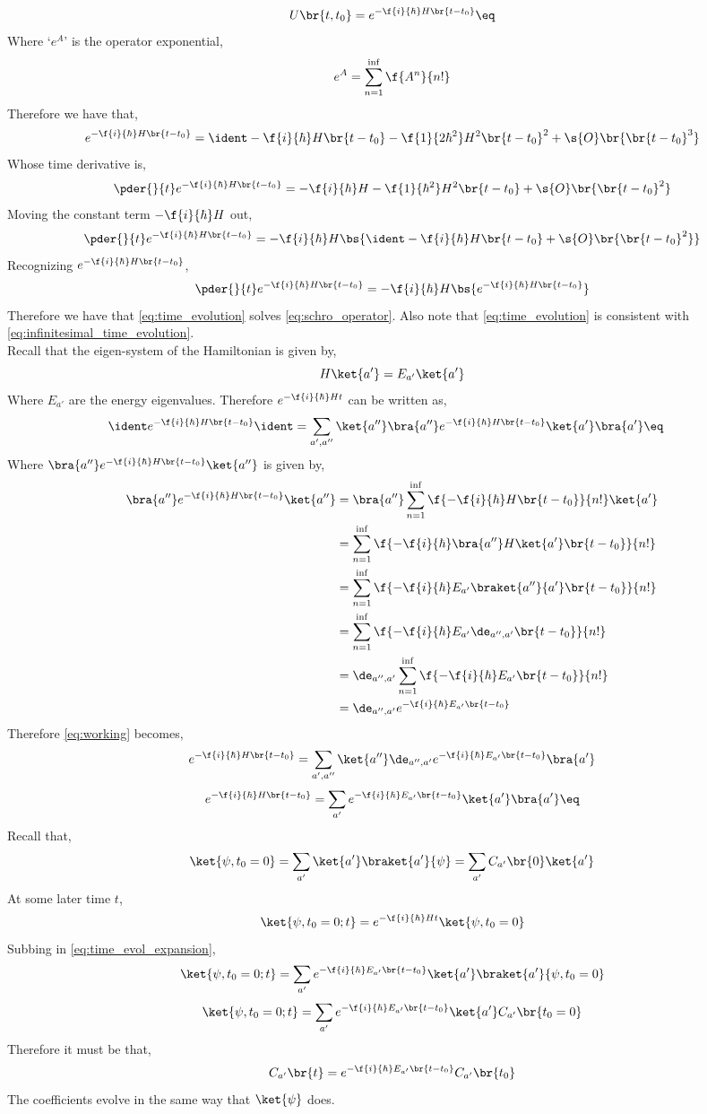 \documentclass{article}
\begin{document}
\[ U \br{t, t_0} = e^{-\f{i}{\hbar} H\br{t - t_0}} \eq \label{eq:time_evolution}\]
Where `$e^A$' is the operator exponential,
\[ e^{A} = \sum_{n=1}^{\inf} \f{A^n}{n!} \]
Therefore we have that,
\[ e^{-\f{i}{\hbar} H\br{t - t_0}} = \ident -\f{i}{\hbar} H\br{t - t_0} -\f{1}{2\hbar^2} H^2\br{t - t_0}^2 + \s{O}\br{\br{t-t_0}^{3}}\]
Whose time derivative is,
\[ \pder{}{t}e^{-\f{i}{\hbar} H\br{t - t_0}} = -\f{i}{\hbar} H -\f{1}{\hbar^2} H^2\br{t - t_0} + \s{O}\br{\br{t-t_0}^{2}}\]
Moving the constant term $- \f{i}{\hbar} H$ out,
\[ \pder{}{t}e^{-\f{i}{\hbar} H\br{t - t_0}} =  - \f{i}{\hbar} H \bs{\ident -\f{i}{\hbar} H \br{t -t_0} + \s{O}\br{\br{t-t_0}^{2}}}\]
Recognizing $e^{-\f{i}{\hbar} H\br{t - t_0}}$,
\[ \pder{}{t}e^{-\f{i}{\hbar} H\br{t - t_0}} =  - \f{i}{\hbar} H \bs{e^{-\f{i}{\hbar} H\br{t - t_0}}}\]
Therefore we have that \cref{eq:time_evolution} solves \cref{eq:schro_operator}. Also note that \cref{eq:time_evolution} is consistent with \cref{eq:infinitesimal_time_evolution}. \\

Recall that the eigen-system of the Hamiltonian is given by,
\[ H \ket{a'} = E_{a'} \ket{a'} \]
Where $E_{a'}$ are the energy eigenvalues. Therefore $e^{- \f{i}{\hbar} H t}$ can be written as,
\begin{align*}
    \ident e^{-\f{i}{\hbar} H\br{t - t_0}} \ident &= \sum_{a', a''} \ket{a''}\bra{a''} e^{-\f{i}{\hbar} H\br{t - t_0}} \ket{a'}\bra{a'} \eq \label{eq:working}
\end{align*}
Where $\bra{a''} e^{-\f{i}{\hbar} H\br{t - t_0}} \ket{a''}$ is given by,
\begin{align*}
    \bra{a''} e^{-\f{i}{\hbar} H\br{t - t_0}} \ket{a''} &= \bra{a''} \sum_{n=1}^{\inf} \f{-\f{i}{\hbar} H\br{t - t_0}}{n!} \ket{a'}\\
    &=  \sum_{n=1}^{\inf} \f{-\f{i}{\hbar} \bra{a''}H\ket{a'}\br{t - t_0}}{n!} \\
    &=  \sum_{n=1}^{\inf} \f{-\f{i}{\hbar} E_{a'}\braket{a''}{a'}\br{t - t_0}}{n!} \\
    &=  \sum_{n=1}^{\inf} \f{-\f{i}{\hbar} E_{a'}\de_{a'',a'}\br{t - t_0}}{n!} \\
    &=  \de_{a'',a'}\sum_{n=1}^{\inf} \f{-\f{i}{\hbar} E_{a'}\br{t - t_0}}{n!} \\
    &=  \de_{a'',a'}e^{-\f{i}{\hbar} E_{a'}\br{t - t_0}}
\end{align*}
Therefore \cref{eq:working} becomes,
\[ e^{-\f{i}{\hbar} H\br{t - t_0}} = \sum_{a', a''} \ket{a''}\de_{a'',a'}e^{-\f{i}{\hbar} E_{a'}\br{t - t_0}}\bra{a'} \]
\[ e^{-\f{i}{\hbar} H\br{t - t_0}} = \sum_{a'}e^{-\f{i}{\hbar} E_{a'}\br{t - t_0}}\ket{a'}\bra{a'} \eq \label{eq:time_evol_expansion}\]
Recall that,
\[ \ket{\psi, t_0 = 0} = \sum_{a'}\ket{a'} \braket{a'}{\psi} = \sum_{a'} C_{a'}\br{0}\ket{a'} \]
At some later time $t$,
\[ \ket{\psi, t_0 = 0; t} = e^{-\f{i}{\hbar} H t} \ket{\psi, t_0 = 0} \]
Subbing in \cref{eq:time_evol_expansion},
\[ \ket{\psi, t_0 = 0; t} = \sum_{a'}e^{-\f{i}{\hbar} E_{a'}\br{t - t_0}}\ket{a'}\braket{a'}{\psi, t_0 = 0}  \]
\[ \ket{\psi, t_0 = 0; t} = \sum_{a'}e^{-\f{i}{\hbar} E_{a'}\br{t - t_0}}\ket{a'}C_{a'}\br{t_0 = 0} \]
Therefore it must be that,
\[ C_{a'}\br{t} = e^{-\f{i}{\hbar} E_{a'}\br{t - t_0}} C_{a'}\br{t_0} \]
The coefficients evolve in the same way that $\ket{\psi}$ does.
\end{document}
